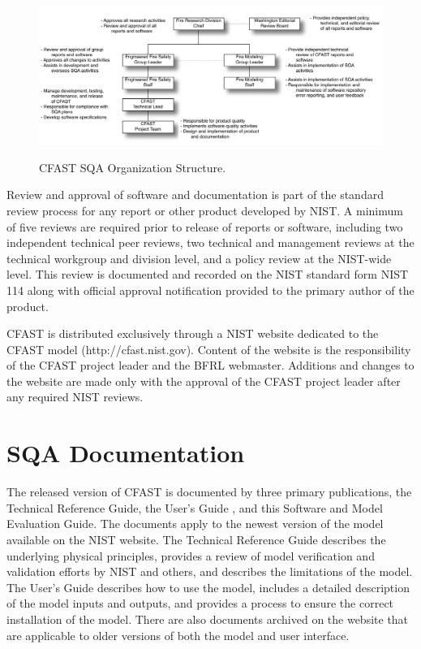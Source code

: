 \begin{figure}
\begin{center}
\includegraphics[width=6.5in]{FIGURES/OrgChart.pdf}\\
\end{center}
\caption{CFAST SQA Organization Structure.}
 \label{figOrgChart}
\end{figure}

Review and approval of software and documentation is part of the standard review process for any report or other product developed by NIST. A minimum of five reviews are required prior to release of reports or software, including two independent technical peer reviews, two technical and management reviews at the technical workgroup and division level, and a policy review at the NIST-wide level.  This review is documented and recorded on the NIST standard form NIST 114 along with official approval notification provided to the primary author of the product.

CFAST is distributed exclusively through a NIST website dedicated to the CFAST model (http://cfast.nist.gov).  Content of the website is the responsibility of the CFAST project leader and the BFRL webmaster. Additions and changes to the website are made only with the approval of the CFAST project leader after any required NIST reviews.

\section{SQA Documentation}

The released version of CFAST is documented by three primary publications, the Technical Reference Guide\cite{CFAST_Tech_Guide_6}, the User's Guide \cite{CFAST_Users_Guide_6}, and this Software and Model Evaluation Guide. The documents apply to the newest version of the model available on the NIST website. The Technical Reference Guide describes the underlying physical principles, provides a review of model verification and validation efforts by NIST and others, and describes the limitations of the model.  The User's Guide describes how to use the model, includes a detailed description of the model inputs and outputs, and provides a process to ensure the correct installation of the model. There are also documents archived on the website that are applicable to older versions of both the model and user interface.

